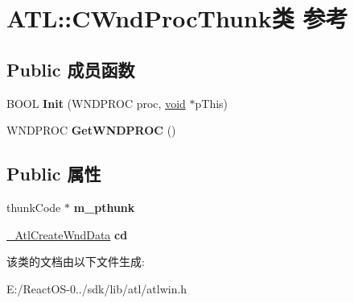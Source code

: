 \hypertarget{class_a_t_l_1_1_c_wnd_proc_thunk}{}\section{A\+TL\+:\+:C\+Wnd\+Proc\+Thunk类 参考}
\label{class_a_t_l_1_1_c_wnd_proc_thunk}
\subsection*{Public 成员函数}
\begin{DoxyCompactItemize}
\item 
\mbox{\label{class_a_t_l_1_1_c_wnd_proc_thunk_ae481522a9d1a6a165ad570503f435d35}} 
B\+O\+OL {\bfseries Init} (W\+N\+D\+P\+R\+OC proc, \hyperlink{interfacevoid}{void} $\ast$p\+This)
\item 
\mbox{\label{class_a_t_l_1_1_c_wnd_proc_thunk_a355a810280c52c1d4fee6d0ba709e8f0}} 
W\+N\+D\+P\+R\+OC {\bfseries Get\+W\+N\+D\+P\+R\+OC} ()
\end{DoxyCompactItemize}
\subsection*{Public 属性}
\begin{DoxyCompactItemize}
\item 
\mbox{\label{class_a_t_l_1_1_c_wnd_proc_thunk_a958ce2d8375fe9ed6f939bd5588de6be}} 
thunk\+Code $\ast$ {\bfseries m\+\_\+pthunk}
\item 
\mbox{\label{class_a_t_l_1_1_c_wnd_proc_thunk_a5addd0249e50f837fac81cd31216de34}} 
\hyperlink{struct_a_t_l_1_1___atl_create_wnd_data}{\+\_\+\+Atl\+Create\+Wnd\+Data} {\bfseries cd}
\end{DoxyCompactItemize}


该类的文档由以下文件生成\+:\begin{DoxyCompactItemize}
\item 
E\+:/\+React\+O\+S-\/0../sdk/lib/atl/atlwin.\+h\end{DoxyCompactItemize}
